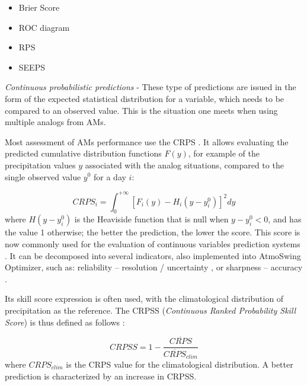 \documentclass[review]{elsarticle}
\begin{document}
\begin{itemize}
	\item Brier Score \citep{Brier1950}
	\item ROC diagram \citep[Relative Operating Characteristic or Receiver Operating Characteristic,][]{Mason1982}
	\item RPS \citep[Ranked Probability Score,][]{Epstein1969}
	\item SEEPS \citep[Stable Equitable Error in Probability Space,][]{Rodwell2010,Rodwell2011}
\end{itemize}


\textit{Continuous probabilistic predictions} - These type of predictions are issued in the form of the expected statistical distribution for a variable, which needs to be compared to an observed value. This is the situation one meets when using multiple analogs from AMs.

Most assessment of AMs performance use the CRPS \citep[Continuous Ranked Probability Score,][]{Brown1974, Matheson1976, Hersbach2000}. It allows evaluating the predicted cumulative distribution functions $F(y)$, for example of the precipitation values $y$ associated with the analog situations, compared to the single observed value $y^{0}$ for a day $i$:

\begin{equation}
\label{eq:CRPS}
CRPS_{i} = \int_{0}^{+\infty} \left[ F_{i}(y)-H_{i}(y-y_{i}^{0})\right]^{2} dy
\end{equation}
where $H(y-y_{i}^{0})$ is the Heaviside function that is null when $y-y_{i}^{0}<0$, and has the value 1 otherwise; the better the prediction, the lower the score. This score is now commonly used for the evaluation of continuous variables prediction systems \citep{Casati2008, Marty2010}. It can be decomposed into several indicators, also implemented into AtmoSwing Optimizer, such as: reliability -- resolution / uncertainty \citep{Hersbach2000}, or sharpness -- accuracy \citep{Bontron2004}.

Its skill score expression is often used, with the climatological distribution of precipitation as the reference. The CRPSS (\textit{Continuous Ranked Probability Skill Score}) is thus defined as follows \citep{Bradley2011}:

\begin{equation}
\label{eq:CRPSS}
CRPSS = 1-\frac{\overline{CRPS}}{\overline{CRPS}_{clim}}
\end{equation}
where $CRPS_{clim}$ is the CRPS value for the climatological distribution. A better prediction is characterized by an increase in CRPSS.
\end{document}
